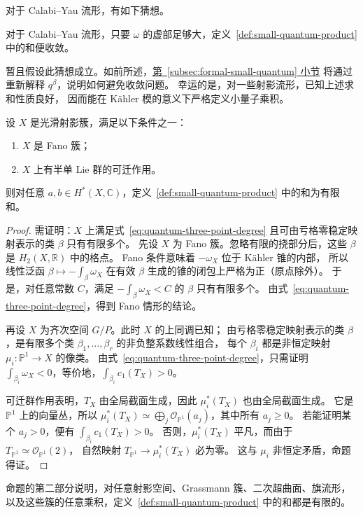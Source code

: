对于 Calabi--Yau 流形，有如下猜想。
\begin{conjecture}\label{conj:small-quantum-convergence}
对于 Calabi--Yau 流形，只要 $\omega$ 的虚部足够大，定义~\ref{def:small-quantum-product} 中的和便收敛。
\end{conjecture}
暂且假设此猜想成立。如前所述，\hyperref[subsec:formal-small-quantum]{第~\ref*{subsec:formal-small-quantum} 小节}
将通过重新解释 $q^\beta$，说明如何避免收敛问题。
幸运的是，对一些射影流形，已知上述求和性质良好，
因而能在 Kähler 模的意义下严格定义小量子乘积。
\begin{proposition}\label{prop:quantum-finite-fano}
设 $X$ 是光滑射影簇，满足以下条件之一：
\begin{enumerate}[label=(\roman*)]
\item $X$ 是 Fano 簇；
\item $X$ 上有半单 Lie 群的可迁作用。
\end{enumerate}
则对任意 $a,b\in H^*(X,\mathbb C)$，定义~\ref{def:small-quantum-product} 中的和为有限和。
\end{proposition}
\begin{proof}
需证明：$X$ 上满足式~\eqref{eq:quantum-three-point-degree} 且可由亏格零稳定映射表示的类 $\beta$ 只有有限多个。
先设 $X$ 为 Fano 簇。忽略有限的挠部分后，这些 $\beta$ 是 $H_2(X,\mathbb R)$ 中的格点。
Fano 条件意味着 $-\omega_X$ 位于 Kähler 锥的内部，
所以线性泛函 $\beta\mapsto-\int_\beta\omega_X$ 在有效 $\beta$ 生成的锥的闭包上严格为正（原点除外）。
于是，对任意常数 $C$，满足 $-\int_\beta\omega_X<C$ 的 $\beta$ 只有有限多个。
由式~\eqref{eq:quantum-three-point-degree}，得到 Fano 情形的结论。

再设 $X$ 为齐次空间 $G/P$。此时 $X$ 的上同调已知；
由亏格零稳定映射表示的类 $\beta$，是有限多个类 $\beta_1,\ldots,\beta_r$ 的非负整系数线性组合，
每个 $\beta_i$ 都是非恒定映射 $\mu_i:\mathbb P^1\to X$ 的像类。
由式~\eqref{eq:quantum-three-point-degree}，只需证明
$\int_{\beta_i}\omega_X<0$，等价地，$\int_{\beta_i}c_1(T_X)>0$。

可迁群作用表明，$T_X$ 由全局截面生成，因此 $\mu_i^*(T_X)$ 也由全局截面生成。
它是 $\mathbb P^1$ 上的向量丛，所以
$\mu_i^*(T_X)\simeq\bigoplus_j\mathcal O_{\mathbb P^1}(a_j)$，其中所有 $a_j\geq0$。
若能证明某个 $a_j>0$，便有 $\int_{\beta_i}c_1(T_X)>0$。
否则，$\mu_i^*(T_X)$ 平凡，而由于 $T_{\mathbb P^1}\simeq\mathcal O_{\mathbb P^1}(2)$，
自然映射 $T_{\mathbb P^1}\to\mu_i^*(T_X)$ 必为零。
这与 $\mu_i$ 非恒定矛盾，命题得证。
\end{proof}
命题的第二部分说明，对任意射影空间、Grassmann 簇、二次超曲面、旗流形，
以及这些簇的任意乘积，定义~\ref{def:small-quantum-product} 中的和都是有限的。

